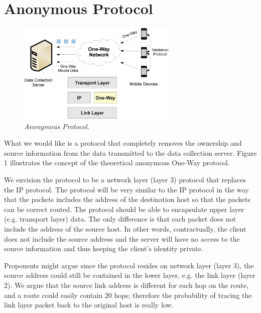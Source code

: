 \section{Anonymous Protocol}\label{sec-protocol}

\begin{figure}[h]
\begin{center}
\includegraphics[width=3in]{figure1.eps}
\caption{\small \sl Anonymous Protocol.\label{fig:Stupendous}}
\end{center}
\end{figure}

What we would like is a protocol that completely removes the ownership and
source information from the data transmitted to the data collection server.
Figure 1 illustrates the concept of the theoretical anonymous One-Way
protocol.

We envision the protocol to be a network layer (layer 3) protocol that
replaces the IP protocol. The protocol will be very similar to the IP protocol
in the way that the packets includes the address of the destination host so
that the packets can be correct routed. The protocol should be able to
encapsulate upper layer (e.g. transport layer) data. The only difference is
that each packet does not include the address of the source host. In other
words, contractually, the client does not include the source address and the
server will have no access to the source information and thus keeping the
client's identity private.

Proponents might argue since the protocol resides on network layer (layer 3),
the source address could still be contained in the lower layer, e.g. the link
layer (layer 2). We argue that the source link address is different for
each hop on the route, and a route could easily contain 20 hops; therefore
the probability of tracing the link layer packet back to the original host is
really low.


